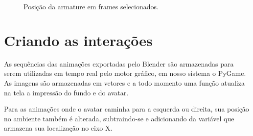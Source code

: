 \begin{figure}[!htbp]
  \centering
  \caption{Posição da armature em frames selecionados.}
  \label{img:armature}
\end{figure}

\section{Criando as interações}

As sequências das animações exportadas pelo Blender são armazenadas para serem utilizadas em tempo real pelo motor gráfico, em nosso sistema o PyGame. As imagens são armazenadas em vetores e a todo momento uma função atualiza na tela a impressão do fundo e do avatar.

Para as animações onde o avatar caminha para a esquerda ou direita, sua posição no ambiente também é alterada, subtraindo-se e adicionando da variável que armazena sua localização no eixo X.


